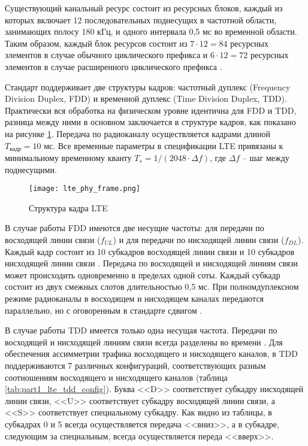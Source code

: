 Существующий канальный ресурс состоит из ресурсных блоков, каждый из которых включает 12 последовательных поднесущих в частотной области, занимающих полосу 180 кГц, и одного интервала 0,5 мс во временной области. Таким образом, каждый блок ресурсов состоит из $7 \cdot 12 = 84$ ресурсных элементов в случае обычного циклического префикса и $6 \cdot 12 = 72$ ресурсных элементов в случае расширенного циклического префикса \cite{Dahlman2013}.

Стандарт поддерживает две структуры кадров: частотный дуплекс (Frequency Division Duplex, FDD) и временной дуплекс (Time Division Duplex, TDD). Практически вся обработка на физическом уровне идентична для FDD и TDD, разница между ними в основном заключается в структуре кадров, как показано на рисунке \cref{fig:part1_lte_phy_frame}. Передача по радиоканалу осуществляется кадрами длиной $T_{\text{кадр}} = 10$ мс. Все временные параметры в спецификации LTE привязаны к минимальному временному кванту $T_s = 1 / (2048 \cdot \Delta f)$, где $\Delta f$ -- шаг между поднесущими.

\begin{figure}[h!]
  \centering
   \texttt{[image: lte\_phy\_frame.png]}
\caption{Структура кадра LTE}
\label{fig:part1_lte_phy_frame}
\end{figure}

В случае работы FDD имеются две несущие частоты: для передачи по восходящей линии связи ($f_{UL}$) и для передачи по нисходящей линии связи ($f_{DL}$). Каждый кадр состоит из 10 субкадров восходящей линии связи и 10 субкадров нисходящей линии связи \cite{David2009}. Передача по восходящей и нисходящей линиям связи может происходить одновременно в пределах одной соты. Каждый субкадр состоит из двух смежных слотов длительностью 0,5 мс. При полномдуплексном режиме радиоканалы в восходящем и нисходящем каналах передаются параллельно, но с оговоренным в стандарте сдвигом \cite{Vishnevsky2009}. 

В случае работы TDD имеется только одна несущая частота. Передачи по восходящей и нисходящей линиям связи всегда разделены во времени \cite{David2009}. Для обеспечения ассимметрии трафика восходящего и нисходящего каналов, в TDD поддерживаются 7 различных конфигураций, соответствующих разным соотношениям восходящего и нисходящего каналов (таблица \cref{tab:part1_lte_tdd_config}). Буква <<D>> соответствует субкадру нисходящей линии связи, <<U>> соответствует субкадру восходящей линии связи, а <<S>> соответствует специальному субкадру. Как видно из таблицы, в субкадрах 0 и 5 всегда осуществляется передача <<вниз>>, а в субкадре, следующим за специальным, всегда осуществляется переда <<вверх>>.


